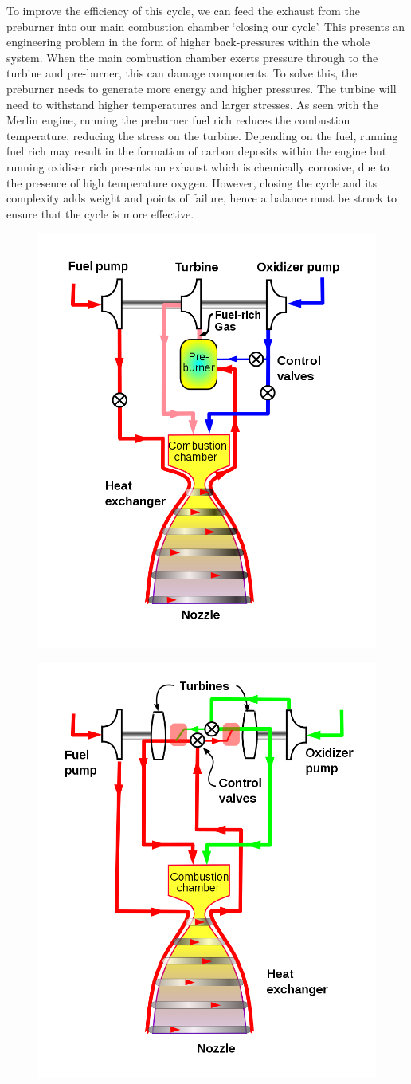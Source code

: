 \documentclass[11pt]{article}
\numberwithin{equation}{section}
\begin{document}
To improve the efficiency of this cycle, we can feed the exhaust from the preburner into our main combustion chamber `closing our cycle'. This presents an engineering problem in the form of higher back-pressures within the whole system. When the main combustion chamber exerts pressure through to the turbine and pre-burner, this can damage components. To solve this, the preburner needs to generate more energy and higher pressures. The turbine will need to withstand higher temperatures and larger stresses. As seen with the Merlin engine, running the preburner fuel rich reduces the combustion temperature, reducing the stress on the turbine. Depending on the fuel, running fuel rich may result in the formation of carbon deposits within the engine but running oxidiser rich presents an exhaust which is chemically corrosive, due to the presence of high temperature oxygen. However, closing the cycle and its complexity adds weight and points of failure, hence a balance must be struck to ensure that the cycle is more effective.

\begin{figure}[H]
    \centering
    \begin{minipage}{.5\textwidth}
        \centering
        \includegraphics[height = 25ex]{./img/closedCycle.png}
        \label{closedCycle}
    \end{minipage}%
    \begin{minipage}{.5\textwidth}
        \centering
        \includegraphics[height = 25ex]{./img/fullFlowCycle.png}
        \label{fullFlow}
    \end{minipage}
\end{figure}
\end{document}
